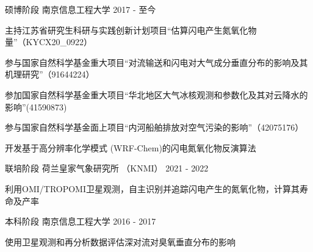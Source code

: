 

\begin{cventries}

  \cventry
    {硕博阶段} %
    {南京信息工程大学} %
    {2017 - 至今} %
    {}%
    {
      \begin{cvitems} %
        \item {主持江苏省研究生科研与实践创新计划项目“估算闪电产生氮氧化物量”（KYCX20\_0922）} %
        \item {参与国家自然科学基金重大项目“对流输送和闪电对大气成分垂直分布的影响及其机理研究”（91644224）} %
        \item {参加国家自然科学基金重大项目“华北地区大气冰核观测和参数化及其对云降水的影响”(41590873)} %
        \item {参与国家自然科学基金面上项目“内河船舶排放对空气污染的影响”（42075176）} %
        \item {开发基于高分辨率化学模式 (WRF-Chem)的闪电氮氧化物反演算法} %
      \end{cvitems}
    }

  \cventry
    {联培阶段} %
    {荷兰皇家气象研究所 （KNMI）} %
    {2021 - 2022} %
    {}%
    {
      \begin{cvitems} %
        \item {利用OMI/TROPOMI卫星观测，自主识别并追踪闪电产生的氮氧化物，计算其寿命及产率}
      \end{cvitems}
    }

  \cventry
    {本科阶段} %
    {南京信息工程大学} %
    {2016 - 2017} %
    {}%
    {
      \begin{cvitems} %
        \item {使用卫星观测和再分析数据评估深对流对臭氧垂直分布的影响}
      \end{cvitems}
    }


\end{cventries}
